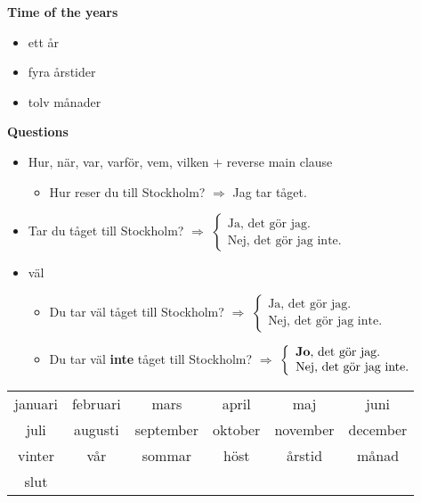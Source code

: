 
\begin{flushleft}
    \textbf{Time of the years}
    \begin{itemize}
        \item ett år
        \item fyra årstider
        \item tolv månader
    \end{itemize}

    \textbf{Questions}
    \begin{itemize}
        \item Hur, när, var, varför, vem, vilken $+$ reverse main clause
        \begin{itemize}
            \item Hur reser du till Stockholm? $\Rightarrow$ Jag tar tåget.
        \end{itemize}
        \item Tar du tåget till Stockholm? $\Rightarrow$ $\left\{
            \begin{array}{l}
                \text{Ja, det gör jag.} \\
                \text{Nej, det gör jag inte.}
            \end{array}
        \right.$
        \item väl
        \begin{itemize}
            \item Du tar väl tåget till Stockholm? $\Rightarrow$ $\left\{
                \begin{array}{l}
                    \text{Ja, det gör jag.} \\
                    \text{Nej, det gör jag inte.}
                \end{array}
            \right.$
            \item Du tar väl \textbf{inte} tåget till Stockholm? $\Rightarrow$ $\left\{
                \begin{array}{l}
                    \text{\textbf{Jo}, det gör jag.} \\
                    \text{Nej, det gör jag inte.}
                \end{array}
            \right.$
        \end{itemize}
    \end{itemize}
\end{flushleft}

\begin{center}
    \begin{tabular}{|c c c c c c|}
        \hline
        januari & februari & mars & april & maj & juni \\
        juli & augusti & september & oktober & november & december \\
        vinter & vår & sommar & höst & årstid & månad \\
        slut &  &  &  &  &  \\
        \hline
    \end{tabular}
\end{center}

